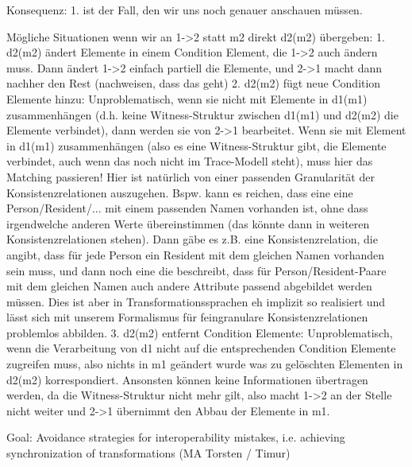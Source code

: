 Konsequenz: 1. ist der Fall, den wir uns noch genauer anschauen müssen.

Mögliche Situationen wenn wir an 1->2 statt m2 direkt d2(m2) übergeben:
1. d2(m2) ändert Elemente in einem Condition Element, die 1->2 auch ändern muss. Dann ändert 1->2 einfach partiell die Elemente, und 2->1 macht dann nachher den Rest (nachweisen, dass das geht)
2. d2(m2) fügt neue Condition Elemente hinzu: Unproblematisch, wenn sie nicht mit Elemente in d1(m1) zusammenhängen (d.h. keine Witness-Struktur zwischen d1(m1) und d2(m2) die Elemente verbindet), dann werden sie von 2->1 bearbeitet. Wenn sie mit Element in d1(m1) zusammenhängen (also es eine Witness-Struktur gibt, die Elemente verbindet, auch wenn das noch nicht im Trace-Modell steht), muss hier das Matching passieren! Hier ist natürlich von einer passenden Granularität der Konsistenzrelationen auszugehen. Bspw. kann es reichen, dass eine eine Person/Resident/... mit einem passenden Namen vorhanden ist, ohne dass irgendwelche anderen Werte übereinstimmen (das könnte dann in weiteren Konsistenzrelationen stehen). Dann gäbe es z.B. eine Konsistenzrelation, die angibt, dass für jede Person ein Resident mit dem gleichen Namen vorhanden sein muss, und dann noch eine die beschreibt, dass für Person/Resident-Paare mit dem gleichen Namen auch andere Attribute passend abgebildet werden müssen. Dies ist aber in Transformationssprachen eh implizit so realisiert und lässt sich mit unserem Formalismus für feingranulare Konsistenzrelationen problemlos abbilden.
3. d2(m2) entfernt Condition Elemente: Unproblematisch, wenn die Verarbeitung von d1 nicht auf die entsprechenden Condition Elemente zugreifen muss, also nichts in m1 geändert wurde was zu gelöschten Elementen in d2(m2) korrespondiert. Ansonsten können keine Informationen übertragen werden, da die Witness-Struktur nicht mehr gilt, also macht 1->2 an der Stelle nicht weiter und 2->1 übernimmt den Abbau der Elemente in m1.




Goal: Avoidance strategies for interoperability mistakes, i.e. achieving synchronization of transformations (MA Torsten / Timur)
\label{chap:prevention:interoperability}

